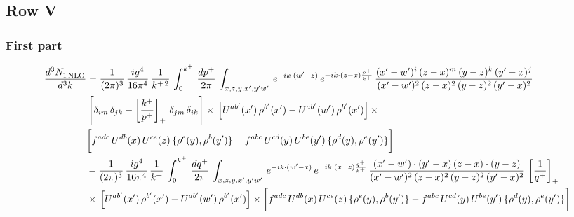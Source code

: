 \documentclass[9pt]{article}
\numberwithin{equation}{section}
\begin{document}
\subsection{Row V}
\subsubsection*{First part}
\begin{align}
     \frac{d^{3}N_{1\,\rm NLO}^{\rm}}{d^{3}k}  & =  \frac{1}{(2\pi)^{3}}\, \frac{ig^{4}}{16\pi^{4}}\, \frac{1}{k^{+\,2}}\,\int_{0}^{k^{+}}\, \frac{dp^{+}}{2\pi}\,\int_{x,z,y,x',y'w'}\,e^{-ik\cdot (w^\prime-z)}\,e^{-ik\cdot (z-x)\frac{p^{+}}{k^{+}}}\,\frac{(x'-w')^{i}\,(z-x)^{m}\,(y-z)^{k}\,(y'-x)^{j}}{(x'-w')^{2}\,(z-x)^{2}\,(y-z)^{2}\,(y'-x)^{2}}\,\notag \\ & \left[\delta_{im}\,\delta_{jk}-\left[\frac{k^{+}}{p^{+}}\right]_{+}\, \delta_{jm}\,\delta_{ik}\right]\times\, \left[U^{ab'}(x')\,\rho^{b'}(x')-U^{ab'}(w')\,\rho^{b'}(x')\right]\times\notag \\ & \bigg[f^{adc}\,U^{db}(x)\,U^{ce}(z)\, \{\rho^{e}(y),\rho^{b}(y')\}-f^{abc}\,U^{cd}(y)\,U^{be}(y')\, \{\rho^{d}(y),\rho^{e}(y')\}\bigg] \notag \\ & -\frac{1}{(2\pi)^{3}}\, \frac{ig^{4}}{16\pi^{4}}\, \frac{1}{k^{+}}\,\int_{0}^{k^{+}}\, \frac{dq^{+}}{2\pi}\,\int_{x,z,y,x',y'w'}\,e^{-ik\cdot (w^\prime-x)}\,e^{-ik\cdot (x-z)\frac{q^{+}}{k^{+}}}\,\frac{(x'-w')\cdot (y'-x)\,(z-x)\cdot (y-z)}{(x'-w')^{2}\,(z-x)^{2}\,(y-z)^{2}\,(y'-x)^{2}}\,\left[\frac{1}{q^{+}}\right]_{+}\notag \\ & \times\, \left[U^{ab'}(x')\,\rho^{b'}(x')-U^{ab'}(w')\,\rho^{b'}(x')\right]\times \bigg[f^{adc}\,U^{db}(x)\,U^{ce}(z)\, \{\rho^{e}(y),\rho^{b}(y')\}-f^{abc}\,U^{cd}(y)\,U^{be}(y')\, \{\rho^{d}(y),\rho^{e}(y')\}\bigg]
\end{align}
\end{document}
